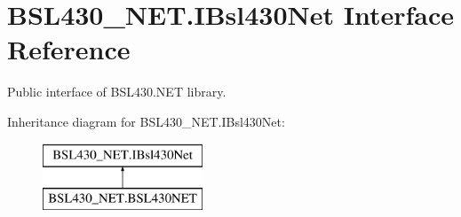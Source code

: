 \hypertarget{interface_b_s_l430___n_e_t_1_1_i_bsl430_net}{}\section{B\+S\+L430\+\_\+\+N\+E\+T.\+I\+Bsl430\+Net Interface Reference}
\label{interface_b_s_l430___n_e_t_1_1_i_bsl430_net}


Public interface of B\+S\+L430.\+N\+ET library.  


Inheritance diagram for B\+S\+L430\+\_\+\+N\+E\+T.\+I\+Bsl430\+Net\+:\begin{figure}[H]
\begin{center}
\leavevmode
\includegraphics[height=2.000000cm]{interface_b_s_l430___n_e_t_1_1_i_bsl430_net}
\end{center}
\end{figure}
